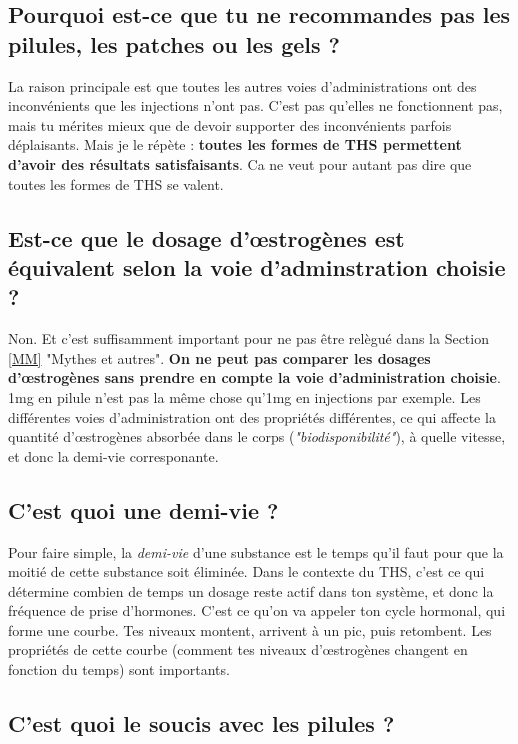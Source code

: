 \documentclass{article}
\begin{document}
\subsection{Pourquoi est-ce que tu ne recommandes pas les pilules, les patches ou les gels ?}

La raison principale est que toutes les autres voies d'administrations ont des inconvénients que les injections n'ont pas. C'est pas qu'elles ne fonctionnent pas, mais tu mérites mieux que de devoir supporter des inconvénients parfois déplaisants. Mais je le répète : \textbf{toutes les formes de THS permettent d'avoir des résultats satisfaisants}. Ca ne veut pour autant pas dire que toutes les formes de THS se valent.

\subsection{Est-ce que le dosage d'œstrogènes est équivalent selon la voie d'adminstration choisie ?}

Non. Et c'est suffisamment important pour ne pas être relègué dans la Section \ref{MM} "Mythes et autres". \textbf{On ne peut pas comparer les dosages d'œstrogènes sans prendre en compte la voie d'administration choisie}. 1mg en pilule n'est pas la même chose qu'1mg en injections par exemple. Les différentes voies d'administration ont des propriétés différentes, ce qui affecte la quantité d'œstrogènes absorbée dans le corps (\textit{"biodisponibilité"}), à quelle vitesse, et donc la demi-vie corresponante.

\subsection{C'est quoi une demi-vie ?}

Pour faire simple, la \textit{demi-vie} d'une substance est le temps qu'il faut pour que la moitié de cette substance soit éliminée. Dans le contexte du THS, c'est ce qui détermine combien de temps un dosage reste actif dans ton système, et donc la fréquence de prise d'hormones. C'est ce qu'on va appeler ton cycle hormonal, qui forme une courbe. Tes niveaux montent, arrivent à un pic, puis retombent. Les propriétés de cette courbe (comment tes niveaux d'œstrogènes changent en fonction du temps) sont importants.

\subsection{C'est quoi le soucis avec les pilules ?}
\end{document}
